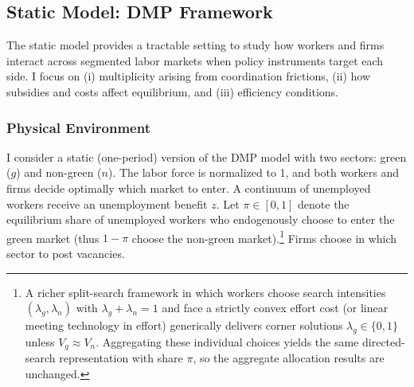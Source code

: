 \documentclass[preprint,12pt]{elsarticle}
\begin{document}
\subsection{Static Model: DMP Framework}
\label{sec:static-model}

The static model provides a tractable setting to study how workers and firms interact across segmented labor markets when policy instruments target each side. I focus on (i) multiplicity arising from coordination frictions, (ii) how subsidies and costs affect equilibrium, and (iii) efficiency conditions.

\subsubsection{Physical Environment}

I consider a static (one-period) version of the DMP model \citep{pissarides2000} with two sectors: green ($g$) and non-green ($n$). The labor force is normalized to 1, and both workers and firms decide optimally which market to enter. A continuum of unemployed workers receive an unemployment benefit $z$. Let $\pi\in[0,1]$ denote the equilibrium share of unemployed workers who endogenously choose to enter the green market (thus $1-\pi$ choose the non-green market).\footnote{A richer split-search framework in which workers choose search intensities $(\lambda_g,\lambda_n)$ with $\lambda_g+\lambda_n=1$ and face a strictly convex effort cost (or linear meeting technology in effort) generically delivers corner solutions $\lambda_g\in\{0,1\}$ unless $V_g\approx V_n$. Aggregating these individual choices yields the same directed-search representation with share $\pi$, so the aggregate allocation results are unchanged.} Firms choose in which sector to post vacancies.
\end{document}
